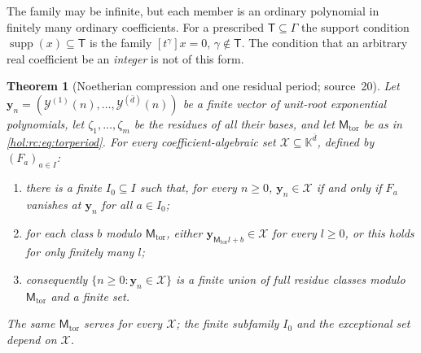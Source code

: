 \documentclass[11pt]{article}
\numberwithin{equation}{section}
\newtheorem{theorem}{Theorem}[section]
\theoremstyle{definition}
\theoremstyle{remark}
\newcommand{\supp}{\operatorname{supp}}
\newcommand{\KK}{\mathbb K}
\begin{document}
The family may be infinite, but each member is an ordinary polynomial in
finitely many ordinary coefficients. For a prescribed $\mathsf T\subseteq\Gamma$
the support condition $\supp(x)\subseteq\mathsf T$ is the family
$[t^\gamma]x=0$, $\gamma\notin\mathsf T$. The condition that an arbitrary real
coefficient be an \emph{integer} is not of this form.

\begin{theorem}[Noetherian compression and one residual period; source~20]
\label{hol:rc:thm:compression}
Let $\mathbf y_n=(\mathcal Y^{(1)}(n),\ldots,\mathcal Y^{(\bar d)}(n))$ be a
finite vector of unit-root exponential polynomials, let
$\zeta_1,\ldots,\zeta_m$ be the residues of all their bases, and let
$\mathsf M_{\mathrm{tor}}$ be as in \eqref{hol:rc:eq:torperiod}. For every
coefficient-algebraic set $\mathcal X\subseteq\KK^{\bar d}$, defined by
$(F_a)_{a\in I}$:
\begin{enumerate}[label=\textup{(\alph*)}]
\item there is a finite $I_0\subseteq I$ such that, for \emph{every} $n\ge0$,
$\mathbf y_n\in\mathcal X$ if and only if $F_a$ vanishes at $\mathbf y_n$ for
all $a\in I_0$;
\item for each class $b$ modulo $\mathsf M_{\mathrm{tor}}$, either
$\mathbf y_{\mathsf M_{\mathrm{tor}}l+b}\in\mathcal X$ for every $l\ge0$, or
this holds for only finitely many $l$;
\item consequently $\{n\ge0:\mathbf y_n\in\mathcal X\}$ is a finite union of
full residue classes modulo $\mathsf M_{\mathrm{tor}}$ and a finite set.
\end{enumerate}
The same $\mathsf M_{\mathrm{tor}}$ serves for every $\mathcal X$; the finite
subfamily $I_0$ and the exceptional set depend on $\mathcal X$.
\end{theorem}
\end{document}
